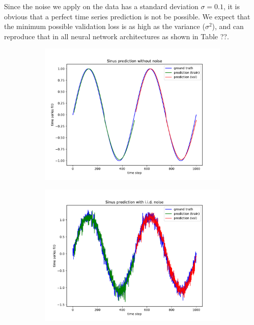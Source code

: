 \documentclass{article}
\begin{document}
Since the noise we apply on the data has a standard deviation $\sigma = 0.1$,
it is obvious that a perfect time series prediction is not be possible. We 
expect that the minimum possible validation loss is as high as the variance 
($\sigma^2$), and can reproduce that in all neural network architectures as
shown in Table ??.%
  
\begin{figure}
  \begin{subfigure}{.35\textwidth}
    \centering
    \includegraphics[width=\linewidth]{figures/plot_twolayer_noiseless.pdf}
  \end{subfigure} 
  \hspace{-5mm}
  \begin{subfigure}{.35\textwidth}
    \centering
    \includegraphics[width=\linewidth]{figures/plot_twolayer_iidnoise.pdf}

\end{subfigure}
\end{figure}
\end{document}
